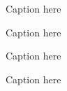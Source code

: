 
\begin{figure}
	\centering
	\resizebox{0.9\columnwidth}{!}{%
		\initialGrid
	}
	\caption{Caption here}
	\label{fig:1:}
\end{figure}

\begin{figure}
	\centering
	\resizebox{0.9\columnwidth}{!}{%
		\stabilizedInitialGrid
	}
	\caption{Caption here}
	\label{fig:2:}
\end{figure}

\begin{figure}
	\centering
	\resizebox{0.9\columnwidth}{!}{%
		\cutGrid
	}
	\caption{Caption here}
	\label{fig:3:}
\end{figure}

\begin{figure}
	\centering
	\resizebox{0.9\columnwidth}{!}{%
		\stabilizedCutGrid
	}
	\caption{Caption here}
	\label{fig:4:}
\end{figure}